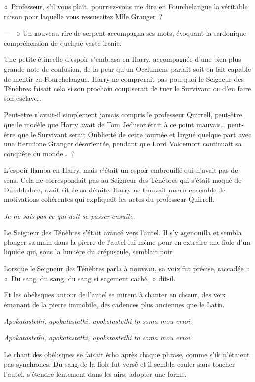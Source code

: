 «~Professeur, s'il vous plaît, pourriez-vous me dire en Fourchelangue la véritable raison pour laquelle vous ressuscitez Mlle Granger~?

--- ~» Un nouveau rire de serpent accompagna ses mots, évoquant la sardonique compréhension de quelque vaste ironie.

Une petite étincelle d'espoir s'embrasa en Harry, accompagnée d'une bien plus grande note de confusion, de la peur qu'un Occlumens parfait soit en fait capable de mentir en Fourchelangue.
Harry ne comprenait pas pourquoi le Seigneur des Ténèbres faisait cela si son prochain coup serait de tuer le Survivant ou d'en faire son esclave…

Peut-être n'avait-il simplement jamais compris le professeur Quirrell, peut-être que le modèle que Harry avait de Tom Jedusor était à ce point mauvais… peut-être que le Survivant serait Oublietté de cette journée et largué quelque part avec une Hermione Granger désorientée, pendant que Lord Voldemort continuait sa conquête du monde…~?

L'espoir flamba en Harry, mais c'était un espoir embrouillé qui n'avait pas de sens.
Cela ne correspondait pas au Seigneur des Ténèbres qui s'était moqué de Dumbledore, avait rit de sa défaite.
Harry ne trouvait aucun ensemble de motivations cohérentes qui expliquait les actes du professeur Quirrell.

\emph{Je ne sais pas ce qui doit se passer ensuite.}

Le Seigneur des Ténèbres s'était avancé vers l'autel.
Il s'y agenouilla et sembla plonger sa main dans la pierre de l'autel lui-même pour en extraire une fiole d'un liquide qui, sous la lumière du crépuscule, semblait noir.

Lorsque le Seigneur des Ténèbres parla à nouveau, sa voix fut précise, saccadée~: «~Du sang, du sang, du sang si sagement caché,~» dit-il.

Et les obélisques autour de l'autel se mirent à chanter en chœur, des voix émanant de la pierre immobile, des cadences plus anciennes que le Latin.

\emph{Apokatastethi, apokatastethi, apokatastethi to soma mou emoi.}

\emph{Apokatastethi, apokatastethi, apokatastethi to soma mou emoi.}

Le chant des obélisques se faisait écho après chaque phrase, comme s'ils n'étaient pas synchrones.
Du sang de la fiole fut versé et il sembla couler sans toucher l'autel, s'étendre lentement dans les airs, adopter une forme.

